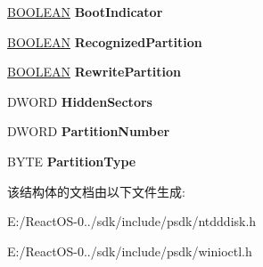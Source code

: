 \begin{DoxyCompactItemize}
\hyperlink{_processor_bind_8h_a112e3146cb38b6ee95e64d85842e380a}{B\+O\+O\+L\+E\+AN} {\bfseries Boot\+Indicator}
\item 
\mbox{\label{struct___p_a_r_t_i_t_i_o_n___i_n_f_o_r_m_a_t_i_o_n_a435b51ed1d396b619a1ea3364a3b4193}} 
\hyperlink{_processor_bind_8h_a112e3146cb38b6ee95e64d85842e380a}{B\+O\+O\+L\+E\+AN} {\bfseries Recognized\+Partition}
\item 
\mbox{\label{struct___p_a_r_t_i_t_i_o_n___i_n_f_o_r_m_a_t_i_o_n_adb5dee551f5ac1384aab99086947baee}} 
\hyperlink{_processor_bind_8h_a112e3146cb38b6ee95e64d85842e380a}{B\+O\+O\+L\+E\+AN} {\bfseries Rewrite\+Partition}
\item 
\mbox{\label{struct___p_a_r_t_i_t_i_o_n___i_n_f_o_r_m_a_t_i_o_n_ab18b97cca729ce374817c0ac743ac151}} 
D\+W\+O\+RD {\bfseries Hidden\+Sectors}
\item 
\mbox{\label{struct___p_a_r_t_i_t_i_o_n___i_n_f_o_r_m_a_t_i_o_n_afe6dda3f982cbfd4bd9274945555fd67}} 
D\+W\+O\+RD {\bfseries Partition\+Number}
\item 
\mbox{\label{struct___p_a_r_t_i_t_i_o_n___i_n_f_o_r_m_a_t_i_o_n_a7d9ba54e3803178da603861b26a96b06}} 
B\+Y\+TE {\bfseries Partition\+Type}
\end{DoxyCompactItemize}


该结构体的文档由以下文件生成\+:\begin{DoxyCompactItemize}
\item 
E\+:/\+React\+O\+S-\/0../sdk/include/psdk/ntdddisk.\+h\item 
E\+:/\+React\+O\+S-\/0../sdk/include/psdk/winioctl.\+h\end{DoxyCompactItemize}
